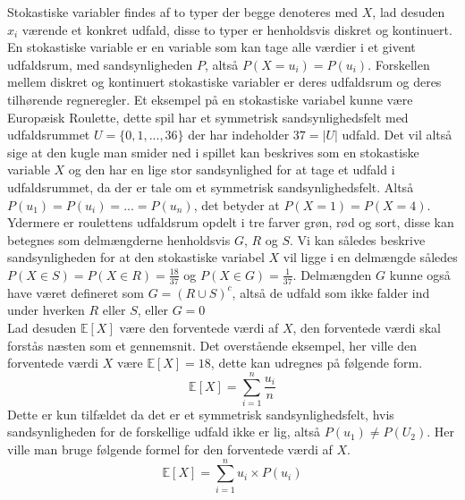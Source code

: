 \documentclass[../../SRP.tex]{subfiles}
\begin{document}
Stokastiske variabler findes af to typer der begge denoteres med $X$, lad desuden $x_i$ værende et konkret udfald, disse to typer er henholdsvis diskret og kontinuert. En stokastiske variable er en variable som kan tage alle værdier i et givent udfaldsrum, med sandsynligheden $P$, altså $P(X = u_i) = P(u_i)$. Forskellen mellem diskret og kontinuert stokastiske variabler er deres udfaldsrum og deres tilhørende regneregler. Et eksempel på en stokastiske variabel kunne være Europæisk Roulette, dette spil har et symmetrisk sandsynlighedsfelt med udfaldsrummet $U = \{ 0,1,...,36\}$ der har indeholder $37 = |U|$ udfald. Det vil altså sige at den kugle man smider ned i spillet kan beskrives som en stokastiske variable $X$ og den har en lige stor sandsynlighed for at tage et udfald i udfaldsrummet, da der er tale om et symmetrisk sandsynlighedsfelt. Altså $P(u_1) = P(u_i) = ... = P(u_n)$, det betyder at $P(X = 1) = P(X = 4)$. Ydermere er roulettens udfaldsrum opdelt i tre farver grøn, rød og sort, disse kan betegnes som delmængderne henholdsvis $G$, $R$ og $S$. Vi kan således beskrive sandsynligheden for at den stokastiske variabel $X$ vil ligge i en delmængde således $P(X \in S) = P(X \in R) = \frac{18}{37}$ og $P(X \in G) = \frac{1}{37}$. Delmængden $G$ kunne også have været defineret som $G = (R \cup S)^c$, altså de udfald som ikke falder ind under hverken $R$ eller $S$, eller $G = 0$ \cite{NM} \\

Lad desuden $\mathbb{E}[X]$ være den forventede værdi af $X$, den forventede værdi skal forstås næsten som et gennemsnit. Det overstående eksempel, her ville den forventede værdi $X$ være $\mathbb{E}[X] = 18$, dette kan udregnes på følgende form.
\begin{equation}
  \mathbb{E}[X] = \sum_{i = 1}^n \frac{u_i}{n}
\end{equation}
Dette er kun tilfældet da det er et symmetrisk sandsynlighedsfelt, hvis sandsynligheden for de forskellige udfald ikke er lig, altså  $P(u_1) \neq P(U_2)$. Her ville man bruge følgende formel for den forventede værdi af $X$.
\begin{equation}
  \mathbb{E}[X] = \sum_{i = 1}^n u_i \times P(u_i)
\end{equation}
\end{document}
